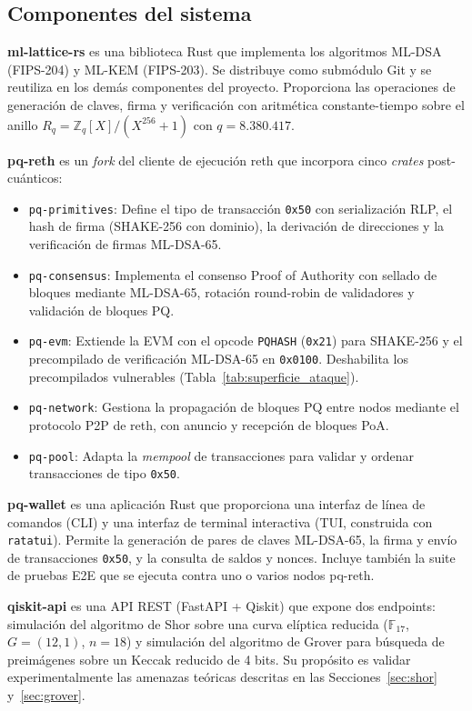 \subsection{Componentes del sistema}

\textbf{ml-lattice-rs} es una biblioteca Rust que implementa los algoritmos ML-DSA (FIPS-204) y ML-KEM (FIPS-203). Se distribuye como submódulo Git y se reutiliza en los demás componentes del proyecto. Proporciona las operaciones de generación de claves, firma y verificación con aritmética constante-tiempo sobre el anillo $R_q = \mathbb{Z}_q[X]/(X^{256} + 1)$ con $q = 8.380.417$.

\textbf{pq-reth} es un \emph{fork} del cliente de ejecución reth que incorpora cinco \emph{crates} post-cuánticos:
\begin{itemize}
  \item \texttt{pq-primitives}: Define el tipo de transacción \texttt{0x50} con serialización RLP, el hash de firma (SHAKE-256 con dominio), la derivación de direcciones y la verificación de firmas ML-DSA-65.
  \item \texttt{pq-consensus}: Implementa el consenso Proof of Authority con sellado de bloques mediante ML-DSA-65, rotación round-robin de validadores y validación de bloques PQ.
  \item \texttt{pq-evm}: Extiende la EVM con el opcode \texttt{PQHASH} (\texttt{0x21}) para SHAKE-256 y el precompilado de verificación ML-DSA-65 en \texttt{0x0100}. Deshabilita los precompilados vulnerables (Tabla~\ref{tab:superficie_ataque}).
  \item \texttt{pq-network}: Gestiona la propagación de bloques PQ entre nodos mediante el protocolo P2P de reth, con anuncio y recepción de bloques PoA.
  \item \texttt{pq-pool}: Adapta la \emph{mempool} de transacciones para validar y ordenar transacciones de tipo \texttt{0x50}.
\end{itemize}

\textbf{pq-wallet} es una aplicación Rust que proporciona una interfaz de línea de comandos (CLI) y una interfaz de terminal interactiva (TUI, construida con \texttt{ratatui}). Permite la generación de pares de claves ML-DSA-65, la firma y envío de transacciones \texttt{0x50}, y la consulta de saldos y nonces. Incluye también la suite de pruebas E2E que se ejecuta contra uno o varios nodos pq-reth.

\textbf{qiskit-api} es una API REST (FastAPI + Qiskit) que expone dos endpoints: simulación del algoritmo de Shor sobre una curva elíptica reducida ($\mathbb{F}_{17}$, $G = (12, 1)$, $n = 18$) y simulación del algoritmo de Grover para búsqueda de preimágenes sobre un Keccak reducido de 4 bits. Su propósito es validar experimentalmente las amenazas teóricas descritas en las Secciones~\ref{sec:shor} y~\ref{sec:grover}.

